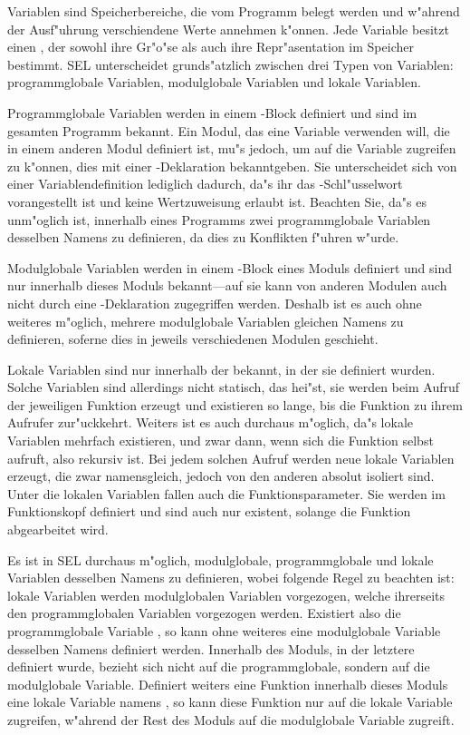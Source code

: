 Variablen sind Speicherbereiche, die
vom Programm belegt werden und w"ahrend der Ausf"uhrung
verschiendene Werte
annehmen k"onnen. Jede Variable besitzt
einen , der sowohl ihre Gr"o"se als auch ihre Repr"asentation
im Speicher bestimmt. SEL unterscheidet grunds"atzlich zwischen
drei Typen von Variablen: programmglobale Variablen, modulglobale
Variablen und lokale Variablen.

Programmglobale Variablen werden in einem -Block
definiert und sind im gesamten Programm bekannt. Ein Modul, das
eine Variable verwenden will, die in einem anderen Modul
definiert ist, mu"s jedoch, um auf die Variable zugreifen zu
k"onnen, dies mit einer -Deklaration bekanntgeben.
Sie unterscheidet sich von einer Variablendefinition lediglich
dadurch, da"s ihr das -Schl"usselwort vorangestellt
ist und keine Wertzuweisung erlaubt ist. Beachten Sie, da"s es
unm"oglich ist, innerhalb eines
Programms zwei programmglobale Variablen desselben Namens zu
definieren, da dies zu Konflikten f"uhren w"urde.

Modulglobale Variablen werden in einem -Block eines
Moduls definiert und sind nur innerhalb dieses Moduls
bekannt---auf sie kann von anderen Modulen auch nicht durch eine
-Deklaration zugegriffen werden. Deshalb ist es auch
ohne weiteres m"oglich, mehrere modulglobale Variablen gleichen
Namens zu definieren, soferne dies in jeweils verschiedenen
Modulen geschieht.

Lokale Variablen sind nur innerhalb der  bekannt, in der
sie definiert wurden. Solche Variablen sind allerdings nicht
statisch, das hei"st, sie werden beim Aufruf der jeweiligen Funktion
erzeugt und existieren so lange, bis die Funktion zu ihrem
Aufrufer zur"uckkehrt. Weiters ist es auch durchaus m"oglich,
da"s lokale Variablen mehrfach existieren, und zwar dann, wenn
sich die Funktion selbst aufruft, also rekursiv ist. Bei jedem
solchen Aufruf werden neue lokale Variablen erzeugt, die zwar
namensgleich, jedoch von den anderen absolut isoliert sind.
Unter die lokalen Variablen fallen auch die Funktionsparameter.
Sie werden im Funktionskopf definiert und sind auch nur existent,
solange die Funktion abgearbeitet wird.

Es ist in SEL durchaus m"oglich, modulglobale, programmglobale
und lokale Variablen desselben Namens zu definieren, wobei
folgende Regel zu beachten ist: lokale Variablen werden
modulglobalen Variablen vorgezogen, welche ihrerseits den
programmglobalen Variablen vorgezogen werden. Existiert also die
programmglobale Variable , so kann ohne weiteres eine
modulglobale Variable desselben Namens definiert werden.
Innerhalb des Moduls, in der letztere definiert wurde, bezieht
sich  nicht auf die programmglobale, sondern auf die
modulglobale Variable. Definiert weiters eine Funktion innerhalb
dieses Moduls eine lokale Variable namens , so kann
diese Funktion nur auf die lokale Variable zugreifen, w"ahrend
der Rest des Moduls auf die modulglobale Variable zugreift.

